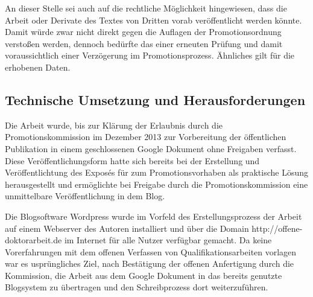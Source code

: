 An dieser Stelle sei auch auf die rechtliche Möglichkeit hingewiesen, dass die Arbeit oder Derivate des Textes von Dritten vorab veröffentlicht werden könnte. Damit würde zwar nicht direkt gegen die Auflagen der Promotionsordnung verstoßen werden, dennoch bedürfte das einer erneuten Prüfung und damit voraussichtlich einer Verzögerung im Promotionsprozess. Ähnliches gilt für die erhobenen Daten.

\subsection{Technische Umsetzung und Herausforderungen}

Die Arbeit wurde, bis zur Klärung der Erlaubnis durch die Promotionskommission im Dezember 2013 zur Vorbereitung der öffentlichen Publikation in einem geschlossenen Google Dokument ohne Freigaben verfasst. Diese Veröffentlichungsform hatte sich bereits bei der Erstellung und Veröffentlichtung des Exposés für zum Promotionsvorhaben \cite{heise_2012_expose} als praktische Lösung herausgestellt und ermöglichte bei Freigabe durch die Promotionskommission eine unmittelbare Veröffentlichung in dem Blog.

Die Blogsoftware Wordpress wurde im Vorfeld des Erstellungsprozess der Arbeit auf einem Webserver des Autoren installiert und über die Domain http://offene-doktorarbeit.de im Internet für alle Nutzer verfügbar gemacht. Da keine Vorerfahrungen mit dem offenen Verfassen von Qualifikationsarbeiten vorlagen war es usprüngliches Ziel, nach Bestätigung der offenen Anfertigung durch die Kommission, die Arbeit aus dem Google Dokument in das bereits genutzte Blogsystem zu übertragen und den Schreibprozess dort weiterzuführen.

